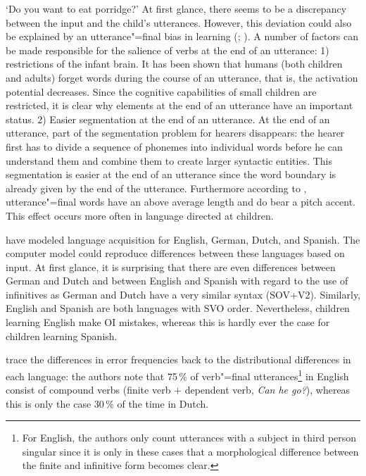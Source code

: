 \glt `Do you want to eat porridge?'
\z
At first glance, there seems to be a discrepancy between the input and the child's utterances.
However, this deviation could also be explained by an utterance"=final bias in learning (\citealp{WKG2001a}; \citealp*{FPG2006a}).
A number of factors can be made responsible for the salience of verbs at the end of an utterance:
1) restrictions of the infant brain. It has been shown that humans (both children and adults) forget words during the course of an
utterance, that is, the activation potential decreases. Since the cognitive capabilities of small children are restricted,
it is clear why elements at the end of an utterance have an important status. 2) Easier segmentation at
the end of an utterance. At the end of an utterance, part of the segmentation problem for hearers disappears:
the hearer first has to divide a sequence of phonemes into individual words before he can understand them and
combine them to create larger syntactic entities.
This segmentation is easier at the end of an utterance since the word boundary is already given by the end of the utterance.
Furthermore according to \citet*[]{WKG2001a}, utterance"=final words have an above average length and do bear a pitch
accent. This effect occurs more often in language directed at children.

\citet*{FPAG2007a} have modeled language acquisition for English, German, Dutch, and Spanish.
The computer model could reproduce differences between these languages based on input. At first glance, it
is surprising that there are even differences between German and Dutch and between English and Spanish with regard to the use of infinitives as
German and Dutch have a very similar syntax (SOV+V2). Similarly, English and Spanish are both languages with SVO order.
Nevertheless, children learning English make OI mistakes, whereas this is hardly ever the case for children learning Spanish.

\citet*{FPAG2007a} trace the differences in error frequencies back to the distributional differences in each language:
the authors note that 75\,\% of verb"=final utterances\footnote{%
	For English, the authors only count utterances with a subject in third person singular since it is only in these cases
	that a morphological difference between the finite and infinitive form becomes clear.%
}
in English consist of compound verbs (finite verb $+$ dependent verb, \eg \emph{Can he go?}), whereas this is only the case
30\,\% of the time in Dutch.

